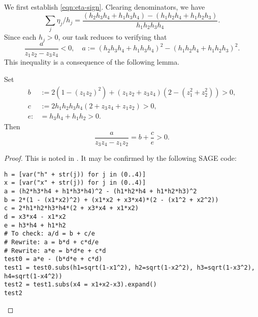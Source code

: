 \documentclass[reqno]{amsart} 
\begin{document}
We first establish \eqref{eqn:eta-sign}.  Clearing denominators, we have
\begin{equation*}
  \sum _j \eta _j  / h _j
  = \frac{(h_2 h_3 h_4 + h_1 h_3 h_4) - (h_1 h_2 h_4 + h_1 h_2 h_3)}{ h_1 h_2 h_3 h_4}.
\end{equation*}
Since each $h_j > 0$, our task reduces to verifying that
\begin{equation*}
  \frac{a}{z_1 z_2 - z_3 z_4} < 0,
  \quad a := (h_2 h_3 h_4 + h_1 h_3 h_4)^2 - (h_1 h_2 h_4 + h_1 h_2 h_3)^2.
\end{equation*}
This inequality is a consequence of the following lemma.
\begin{lemma}\label{lemma:cqx50a3bu6}
  Set
  \begin{align*}
  b &:= 2 (1 - (z _1 z _2 ) ^2) + (z _1 z _2 + z _3 z _4 ) (2 - (z _1^2 +  z _2^2 ) ) > 0, \\
  c &:= 2  h _1 h _2 h _3 h _4 (2 + z _3 z _4 + z _1 z _2) > 0, \\
  e :&= h_3 h_4 + h_1 h_2 > 0.
\end{align*}
Then
\begin{equation*}
  \frac{a}{z _3 z _4 - z _1 z _2 } = b + \frac{c}{e} > 0.
\end{equation*}
\end{lemma}
\begin{proof}
  This is noted in \cite{ki20234}.  It may be confirmed by the following SAGE code:
\begin{verbatim}
h = [var("h" + str(j)) for j in (0..4)]
x = [var("x" + str(j)) for j in (0..4)]
a = (h2*h3*h4 + h1*h3*h4)^2 - (h1*h2*h4 + h1*h2*h3)^2
b = 2*(1 - (x1*x2)^2) + (x1*x2 + x3*x4)*(2 - (x1^2 + x2^2))
c = 2*h1*h2*h3*h4*(2 + x3*x4 + x1*x2)
d = x3*x4 - x1*x2
e = h3*h4 + h1*h2
# To check: a/d = b + c/e
# Rewrite: a = b*d + c*d/e
# Rewrite: a*e = b*d*e + c*d
test0 = a*e - (b*d*e + c*d)
test1 = test0.subs(h1=sqrt(1-x1^2), h2=sqrt(1-x2^2), h3=sqrt(1-x3^2), h4=sqrt(1-x4^2))
test2 = test1.subs(x4 = x1+x2-x3).expand()
test2
\end{verbatim}
\end{proof}
\end{document}
